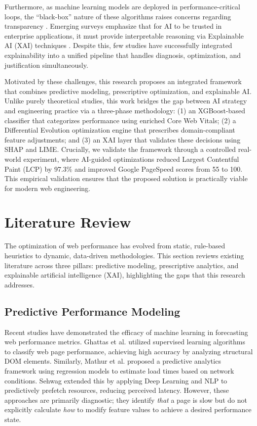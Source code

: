 \documentclass[conference]{IEEEtran}
\begin{document}
Furthermore, as machine learning models are deployed in performance-critical loops, the ``black-box'' nature of these algorithms raises concerns regarding transparency \cite{goyal2025}. Emerging surveys emphasize that for AI to be trusted in enterprise applications, it must provide interpretable reasoning via Explainable AI (XAI) techniques \cite{hassija2024, mersha2024}. Despite this, few studies have successfully integrated explainability into a unified pipeline that handles diagnosis, optimization, and justification simultaneously.

Motivated by these challenges, this research proposes an integrated framework that combines predictive modeling, prescriptive optimization, and explainable AI. Unlike purely theoretical studies, this work bridges the gap between AI strategy and engineering practice via a three-phase methodology: (1) an XGBoost-based classifier that categorizes performance using enriched Core Web Vitals; (2) a Differential Evolution optimization engine that prescribes domain-compliant feature adjustments; and (3) an XAI layer that validates these decisions using SHAP and LIME. Crucially, we validate the framework through a controlled real-world experiment, where AI-guided optimizations reduced Largest Contentful Paint (LCP) by 97.3\% and improved Google PageSpeed scores from 55 to 100. This empirical validation ensures that the proposed solution is practically viable for modern web engineering.

\section{Literature Review}

The optimization of web performance has evolved from static, rule-based heuristics to dynamic, data-driven methodologies. This section reviews existing literature across three pillars: predictive modeling, prescriptive analytics, and explainable artificial intelligence (XAI), highlighting the gaps that this research addresses.

\subsection{Predictive Performance Modeling}
Recent studies have demonstrated the efficacy of machine learning in forecasting web performance metrics. Ghattas et al. \cite{ghattas2025} utilized supervised learning algorithms to classify web page performance, achieving high accuracy by analyzing structural DOM elements. Similarly, Mathur et al. \cite{mathur2024} proposed a predictive analytics framework using regression models to estimate load times based on network conditions. Sehwag \cite{sehwag2024} extended this by applying Deep Learning and NLP to predictively prefetch resources, reducing perceived latency. However, these approaches are primarily diagnostic; they identify \textit{that} a page is slow but do not explicitly calculate \textit{how} to modify feature values to achieve a desired performance state.
\end{document}
